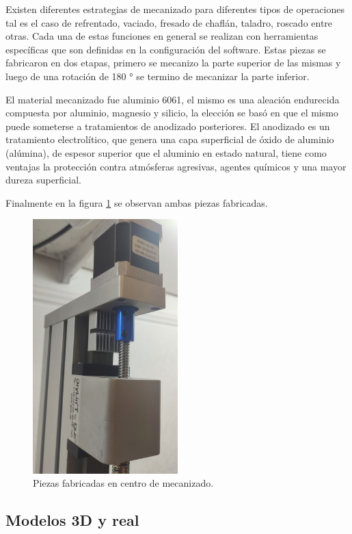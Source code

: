 Existen diferentes estrategias de mecanizado para diferentes tipos de operaciones tal es el caso de refrentado, vaciado, fresado de chaflán, taladro, roscado entre otras. Cada una de estas funciones en general se realizan con herramientas específicas que son definidas en la configuración del software.
Estas piezas se fabricaron en dos etapas, primero se mecanizo la parte superior de las mismas y luego de una rotación de  180 ° se termino de mecanizar la parte inferior.

El material mecanizado fue aluminio 6061, el mismo es una aleación endurecida compuesta por aluminio, magnesio y silicio, la elección se basó en que el mismo puede someterse a tratamientos de anodizado posteriores. El anodizado es un tratamiento electrolítico, que genera una capa superficial de óxido de aluminio (alúmina), de espesor superior que el aluminio en estado natural, tiene como ventajas la protección contra atmósferas agresivas, agentes químicos y una mayor dureza superficial.

Finalmente en la figura \ref{fig:real_custom} se observan ambas piezas fabricadas.

\begin{figure}[h]
	\centering
	\includegraphics[width=0.5\textwidth]{./Figures/real_custom.png}
	\caption{Piezas fabricadas en centro de mecanizado.}
	\label{fig:real_custom}
\end{figure}


\subsection{Modelos 3D y real}

